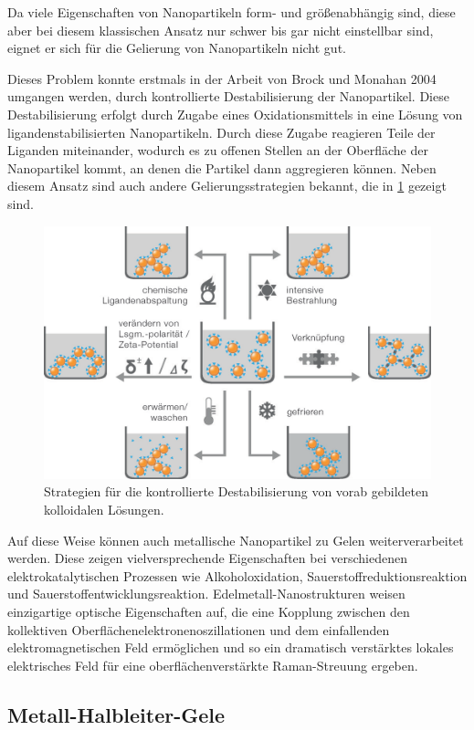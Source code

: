     Da viele Eigenschaften von Nanopartikeln form- und größenabhängig sind, diese aber bei diesem klassischen Ansatz nur schwer bis gar nicht einstellbar sind, eignet er sich für die Gelierung von Nanopartikeln nicht gut.
    
    Dieses Problem konnte erstmals in der Arbeit von Brock und Monahan 2004 umgangen werden, durch kontrollierte Destabilisierung der Nanopartikel. 
    Diese Destabilisierung erfolgt durch Zugabe eines Oxidationsmittels in eine Lösung von ligandenstabilisierten Nanopartikeln.
    Durch diese Zugabe reagieren Teile der Liganden miteinander, wodurch es zu offenen Stellen an der Oberfläche der Nanopartikel kommt, an denen die Partikel dann aggregieren können.
    Neben diesem Ansatz sind auch andere Gelierungsstrategien bekannt, die in \cref{fig:Destabilisierung} gezeigt sind.
    
    \begin{figure}[H]
        \centering
        \includegraphics[width=0.6\linewidth]{Bilder/Gelierung.png}
        \caption{Strategien für die kontrollierte Destabilisierung von vorab gebildeten kolloidalen Lösungen.}
        \label{fig:Destabilisierung}
    \end{figure}
    
    Auf diese Weise können auch metallische Nanopartikel zu Gelen weiterverarbeitet werden. 
    Diese zeigen vielversprechende Eigenschaften bei verschiedenen elektrokatalytischen Prozessen wie Alkoholoxidation, Sauerstoffreduktionsreaktion und Sauerstoffentwicklungsreaktion. 
    Edelmetall-Nanostrukturen weisen einzigartige optische Eigenschaften auf, die eine Kopplung zwischen den kollektiven Oberflächenelektronenoszillationen und dem einfallenden elektromagnetischen Feld ermöglichen und so ein dramatisch verstärktes lokales elektrisches Feld für eine oberflächenverstärkte Raman-Streuung ergeben. 

    
    \subsection{Metall-Halbleiter-Gele}
    \todo{}